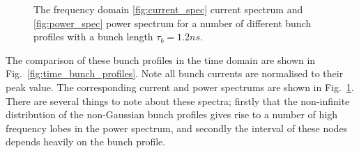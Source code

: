 \begin{figure}
\caption{The frequency domain \ref{fig:current_spec} current spectrum and \ref{fig:power_spec} power spectrum for a number of different bunch profiles with a bunch length $\tau_{b} = 1.2ns$.}
\label{fig:freq_dom_prof}
\end{figure}

The comparison of these bunch profiles in the time domain are shown in Fig.~\ref{fig:time_bunch_profiles}. Note all bunch currents are normalised to their peak value. The corresponding current and power spectrums are shown in Fig.~\ref{fig:freq_dom_prof}. There are several things to note about these spectra; firstly that the non-infinite distribution of the non-Gaussian bunch profiles gives rise to a number of high frequency lobes in the power spectrum, and secondly the interval of these nodes depends heavily on the bunch profile.


